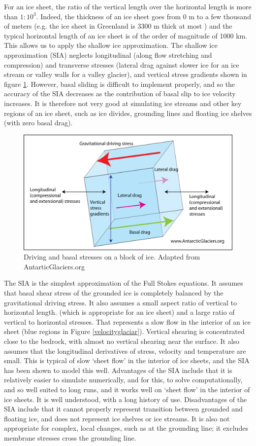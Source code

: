 \documentclass{article}
\begin{document}
For an ice sheet, the ratio of the vertical length over the horizontal length is more than $1:10^3$. Indeed, the thickness of an ice sheet goes from 0 m to a few thousand of meters (e.g. the ice sheet in Greenland is 3300 m thick at most \cite[]{bamber2001new}) and the typical horizontal length of an ice sheet is of the order of magnitude of 1000 km. This allows us to apply the shallow ice approximation. The shallow ice approximation (SIA) neglects longitudinal (along flow stretching and compression) and transverse stresses (lateral drag against slower ice for an ice stream or valley walls for a valley glacier), and vertical stress gradients shown in figure \ref{nine_stresses}. However, basal sliding is difficult to implement properly, and so the accuracy of the SIA decreases as the contribution of basal slip to ice velocity increases. It is therefore not very good at simulating ice streams and other key regions of an ice sheet, such as ice divides, grounding lines and floating ice shelves (with zero basal drag). 
\begin{figure}[!h]
	\centering
	\includegraphics[width=0.7\linewidth]{../fig/nine-stresses.png}
	\caption{Driving and basal stresses on a block of ice. Adapted from AntarticGlaciers.org}
	\label{nine_stresses}
\end{figure}
The SIA is the simplest approximation of the Full Stokes equations. It assumes that basal shear stress of the grounded ice is completely balanced by the gravitational driving stress. It also assumes a small aspect ratio of vertical to horizontal length. (which is appropriate for an ice sheet) and a large ratio of vertical to horizontal stresses. That represents a slow flow in the interior of an ice sheet (blue regions in Figure \ref{velocityglaciar}). Vertical shearing is concentrated close to the bedrock, with almost no vertical shearing near the surface. It also assumes that the longitudinal derivatives of stress, velocity and temperature are small. This is typical of slow ‘sheet flow’ in the interior of ice sheets, and the SIA has been shown to model this well.
Advantages of the SIA include that it is relatively easier to simulate numerically, and for this, to solve computationally, and so well suited to long runs, and it works well on ‘sheet flow’ in the interior of ice sheets. It is well understood, with a long history of use. Disadvantages of the SIA include that it cannot properly represent transition between grounded and floating ice, and does not represent ice shelves or ice streams. It is also not appropriate for complex, local changes, such as at the grounding line; it excludes membrane stresses cross the grounding line.
\end{document}

